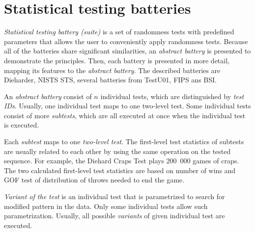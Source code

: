 \documentclass[
  digital,     %
  oneside,     %
  nosansbold,  %
  nocolorbold, %
  nolof,         %
  nolot,         %
]{fithesis4}
\begin{document}
\section{Statistical testing batteries} \label{chap:sols-batteries}



\emph{Statistical testing battery (suite)} is a set of randomness tests with predefined parameters that allows the user to conveniently apply randomness tests. \cite[p. 5]{tu01_guide} Because all of the batteries share significant similarities, an \emph{abstract battery} is presented to demonstrate the principles. Then, each battery is presented in more detail, mapping its features to the \emph{abstract battery}. The described batteries are Dieharder, NISTS STS, several batteries from TestU01, FIPS ans BSI.

An \emph{abstract battery} consist of $n$ individual tests, which are distinguished by \emph{test IDs}. Usually, one individual test maps to one two-level test. Some individual tests consist of more \emph{subtests}, which are all executed at once when the individual test is executed.

Each \emph{subtest} maps to one \emph{two-level test}. The first-level test statistics of subtests are usually related to each other by using the same operation on the tested sequence. For example, the Diehard Craps Test plays 200~000 games of craps. The two calculated first-level test statistics are based on number of wins and GOF test of distribution of throws needed to end the game. \cite{dieharder_orig}

\emph{Variant of the test} is an individual test that is parametrized to search for modified pattern in the data. Only some individual tests allow such parametrization. Usually, all possible \emph{variants} of given individual test are executed.  \cite[p. 2]{vavercak}
\end{document}
